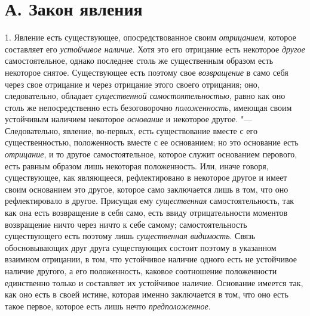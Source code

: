 \section[А. Закон явления]{А. Закон явления}
1. Явление есть существующее, опосредствованное
своим {\em отрицанием}, которое составляет его
{\em устойчивое наличие}. Хотя это его отрицание есть
некоторое {\em другое} самостоятельное, однако
последнее столь же существенным образом есть некоторое снятое. Существующее
есть поэтому свое {\em возвращение} в само себя через
свое отрицание и через отрицание этого своего отрицания; оно,
следовательно, обладает {\em существенной
самостоятельностью}, равно как оно столь же непосредственно есть
безоговорочно {\em положенность}, имеющая своим
устойчивым наличием некоторое {\em основание} и
некоторое другое. "--- Следовательно, явление, во-первых, есть существование
вместе с его существенностью, положенность вместе с ее основанием; но это
основание есть {\em отрицание}, и то другое
самостоятельное, которое служит основанием перового, есть равным образом
лишь некоторая положенность. Или, иначе говоря, существующее, как
являющееся, рефлектировано в некоторое другое и имеет своим основанием это
другое, которое само заключается лишь в том, что оно рефлектировало в
другое. Присущая ему {\em существенная}
самостоятельность, так как она есть возвращение в себя само, есть ввиду
отрицательности моментов возвращение ничто через ничто к себе самому;
самостоятельность существующего есть поэтому лишь
{\em существенная видимость}. Связь обосновывающих друг
друга существующих состоит поэтому в указанном взаимном отрицании, в том,
что устойчивое наличие одного есть не устойчивое наличие другого, а его
положенность, каковое соотношение положенности единственно только и
составляет их устойчивое наличие. Основание имеется так, как оно есть в
своей истине, которая именно заключается в том, что оно есть такое первое,
которое есть лишь нечто {\em предположенное}.

